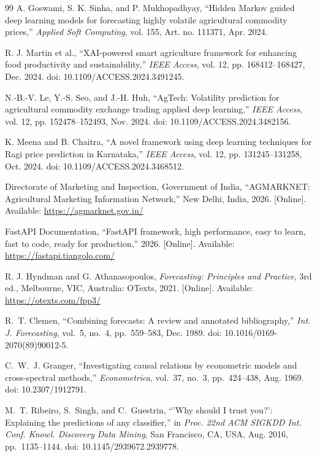 \documentclass[12pt,a4paper]{report}
\theoremstyle{definition}
\theoremstyle{remark}
\begin{document}
\begin{thebibliography}{99}
A. Goswami, S. K. Sinha, and P. Mukhopadhyay,
``Hidden Markov guided deep learning models for forecasting highly volatile agricultural commodity prices,''
{\em Applied Soft Computing}, vol. 155, Art. no. 111371, Apr. 2024.

R. J. Martin et al.,
``XAI-powered smart agriculture framework for enhancing food productivity and sustainability,''
{\em IEEE Access}, vol. 12, pp. 168412--168427, Dec. 2024. doi: 10.1109/ACCESS.2024.3491245.

N.-B.-V. Le, Y.-S. Seo, and J.-H. Huh,
``AgTech: Volatility prediction for agricultural commodity exchange trading applied deep learning,''
{\em IEEE Access}, vol. 12, pp. 152478--152493, Nov. 2024. doi: 10.1109/ACCESS.2024.3482156.

K. Meena and B. Chaitra,
``A novel framework using deep learning techniques for Ragi price prediction in Karnataka,''
{\em IEEE Access}, vol. 12, pp. 131245--131258, Oct. 2024. doi: 10.1109/ACCESS.2024.3468512.

Directorate of Marketing and Inspection, Government of India,
``AGMARKNET: Agricultural Marketing Information Network,'' New Delhi, India, 2026. [Online]. Available: \url{https://agmarknet.gov.in/}

FastAPI Documentation,
``FastAPI framework, high performance, easy to learn, fast to code, ready for production,'' 2026. [Online]. Available: \url{https://fastapi.tiangolo.com/}

R. J. Hyndman and G. Athanasopoulos,
{\em Forecasting: Principles and Practice}, 3rd ed.,
Melbourne, VIC, Australia: OTexts, 2021. [Online]. Available: \url{https://otexts.com/fpp3/}

R.~T. Clemen, ``Combining forecasts: A review and annotated bibliography,'' {\em Int. J. Forecasting}, vol.~5, no.~4, pp.~559--583, Dec. 1989. doi: 10.1016/0169-2070(89)90012-5.

C.~W.~J. Granger, ``Investigating causal relations by econometric models and cross-spectral methods,'' {\em Econometrica}, vol.~37, no.~3, pp.~424--438, Aug. 1969. doi: 10.2307/1912791.

M.~T. Ribeiro, S.~Singh, and C.~Guestrin, ``'Why should I trust you?': Explaining the predictions of any classifier,'' in {\em Proc. 22nd ACM SIGKDD Int. Conf. Knowl. Discovery Data Mining}, San Francisco, CA, USA, Aug. 2016, pp.~1135--1144. doi: 10.1145/2939672.2939778.


\end{thebibliography}
\end{document}
